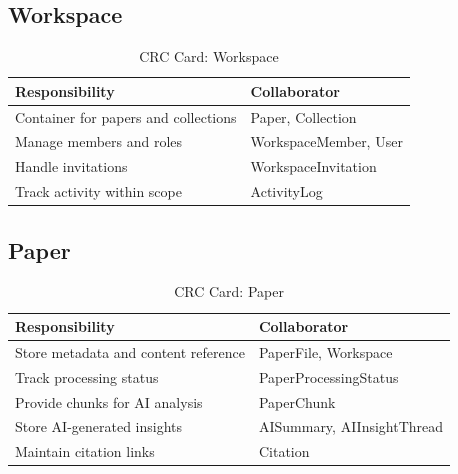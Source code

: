 \subsection{Workspace}

\begin{table}[H]
    \centering
    \small
    \begin{tabularx}{\textwidth}{|l|X|} %
        \hline %
        \textbf{Responsibility}              & \textbf{Collaborator} \\
        \hline %
        Container for papers and collections & Paper, Collection     \\
        \hline %
        Manage members and roles             & WorkspaceMember, User \\
        \hline %
        Handle invitations                   & WorkspaceInvitation   \\
        \hline %
        Track activity within scope          & ActivityLog           \\
        \hline %
    \end{tabularx}
    \caption{CRC Card: Workspace}\label{tab:srs-crc-workspace}
\end{table}

\subsection{Paper}

\begin{table}[H]
    \centering
    \small
    \begin{tabularx}{\textwidth}{|l|X|} %
        \hline %
        \textbf{Responsibility}              & \textbf{Collaborator}      \\
        \hline %
        Store metadata and content reference & PaperFile, Workspace       \\
        \hline %
        Track processing status              & PaperProcessingStatus      \\
        \hline %
        Provide chunks for AI analysis       & PaperChunk                 \\
        \hline %
        Store AI-generated insights          & AISummary, AIInsightThread \\
        \hline %
        Maintain citation links              & Citation                   \\
        \hline %
    \end{tabularx}
    \caption{CRC Card: Paper}\label{tab:srs-crc-paper}
\end{table}

